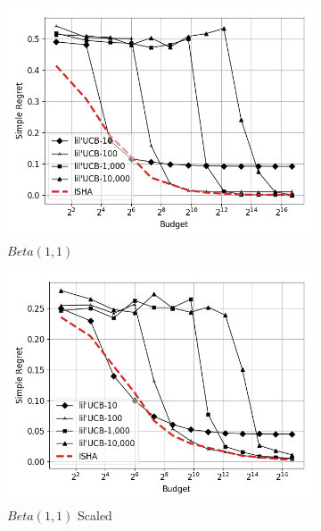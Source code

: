 \begin{figure}
\centering
\caption{Comparison to lil'UCB}
\begin{subfigure}{0.4\textwidth}
	\includegraphics[width=\textwidth]{fixedbudget/figures/folder5/alpha1_beta1_unscaled.png}
	\caption{$Beta(1,1)$}
	\label{appendix:fig:sh-lilucb:alpha1_beta1_unscaled}
\end{subfigure}
\quad
\begin{subfigure}{0.4\textwidth}
	\includegraphics[width=\textwidth]{fixedbudget/figures/folder5/alpha1_beta1_scaled.png}
	\caption{$Beta(1,1)$ Scaled}
	\label{appendix:fig:sh-lilucb:alpha1_beta1_scaled}
\end{subfigure}
%
\begin{subfigure}{0.4\textwidth}

\end{subfigure}
\end{figure}
